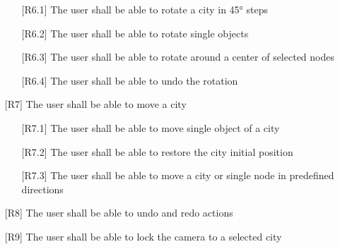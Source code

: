\begin{itemize}
    \begin{itemize}
        \item[{[R6.1]}] The user shall be able to rotate a \gls{city} in 45° steps
        \item[{[R6.2]}] The user shall be able to rotate single objects
        \item[{[R6.3]}] The user shall be able to rotate around a center of selected nodes
        \item[{[R6.4]}] The user shall be able to undo the rotation
    \end{itemize}
    \item[{[R7]}] The user shall be able to move a \gls{city}
    \begin{itemize}
        \item[{[R7.1]}] The user shall be able to move single object of a \gls{city}
        \item[{[R7.2]}] The user shall be able to restore the \gls{city} initial position
        \item[{[R7.3]}] The user shall be able to move a \gls{city} or single node in predefined directions
    \end{itemize}
    \item[{[R8]}] The user shall be able to undo and redo actions
    \item[{[R9]}] The user shall be able to lock the camera to a selected \gls{city}
\end{itemize}